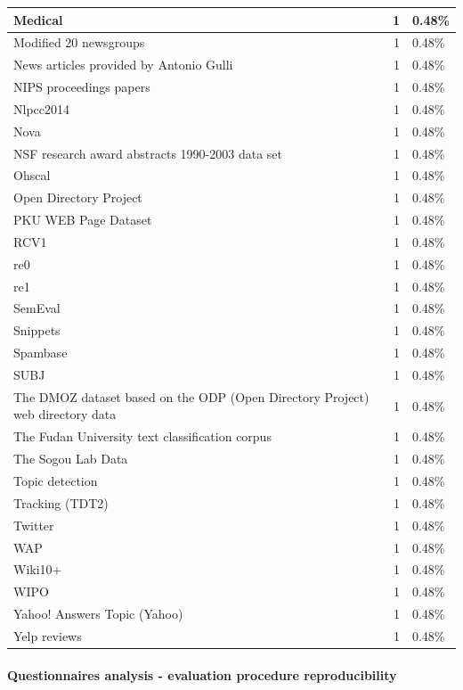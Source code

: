\documentclass[
]{article}
\begin{document}
\begin{table}
\begin{tabular}[t]{l|r|l}
Medical & 1 & 0.48\%\\
\hline
Modified 20 newsgroups & 1 & 0.48\%\\
\hline
News articles provided by Antonio Gulli & 1 & 0.48\%\\
\hline
NIPS proceedings papers & 1 & 0.48\%\\
\hline
Nlpcc2014 & 1 & 0.48\%\\
\hline
Nova & 1 & 0.48\%\\
\hline
NSF research award abstracts 1990-2003 data set & 1 & 0.48\%\\
\hline
Ohscal & 1 & 0.48\%\\
\hline
Open Directory Project & 1 & 0.48\%\\
\hline
PKU WEB Page Dataset & 1 & 0.48\%\\
\hline
RCV1 & 1 & 0.48\%\\
\hline
re0 & 1 & 0.48\%\\
\hline
re1 & 1 & 0.48\%\\
\hline
SemEval & 1 & 0.48\%\\
\hline
Snippets & 1 & 0.48\%\\
\hline
Spambase & 1 & 0.48\%\\
\hline
SUBJ & 1 & 0.48\%\\
\hline
The DMOZ dataset based on the ODP (Open Directory Project) web directory data & 1 & 0.48\%\\
\hline
The Fudan University text classification corpus & 1 & 0.48\%\\
\hline
The Sogou Lab Data & 1 & 0.48\%\\
\hline
Topic detection & 1 & 0.48\%\\
\hline
Tracking (TDT2) & 1 & 0.48\%\\
\hline
Twitter & 1 & 0.48\%\\
\hline
WAP & 1 & 0.48\%\\
\hline
Wiki10+ & 1 & 0.48\%\\
\hline
WIPO & 1 & 0.48\%\\
\hline
Yahoo! Answers Topic (Yahoo) & 1 & 0.48\%\\
\hline
Yelp reviews & 1 & 0.48\%\\
\hline
\end{tabular}
\end{table}

\hypertarget{questionnaires-analysis---evaluation-procedure-reproducibility}{%
\paragraph{Questionnaires analysis - evaluation procedure reproducibility}\label{questionnaires-analysis---evaluation-procedure-reproducibility}}
\end{document}
